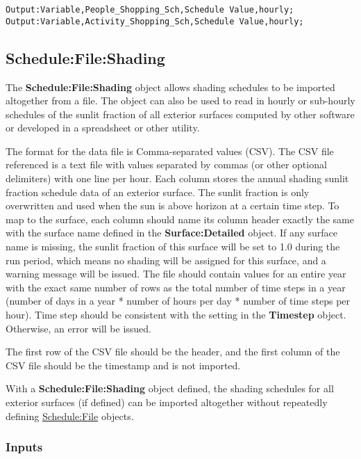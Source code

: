 \begin{lstlisting}
Output:Variable,People_Shopping_Sch,Schedule Value,hourly;
Output:Variable,Activity_Shopping_Sch,Schedule Value,hourly;
\end{lstlisting}

\subsection{Schedule:File:Shading}\label{schedulefileshading}

The \textbf{Schedule:File:Shading} object allows shading schedules to be imported altogether from a file. The object can also be used to read in hourly or sub-hourly schedules of the sunlit fraction of all exterior surfaces computed by other software or developed in a spreadsheet or other utility.

The format for the data file is Comma-separated values (CSV). The CSV file referenced is a text file with values separated by commas (or other optional delimiters) with one line per hour. Each column stores the annual shading sunlit fraction schedule data of an exterior surface. The sunlit fraction is only overwritten and used when the sun is above horizon at a certain time step. To map to the surface, each column should name its column header exactly the same with the surface name defined in the \textbf{Surface:Detailed} object. If any surface name is missing, the sunlit fraction of this surface will be set to 1.0 during the run period, which means no shading will be assigned for this surface, and a warning message will be issued. The file should contain values for an entire year with the exact same number of rows as the total number of time steps in a year (number of days in a year * number of hours per day * number of time steps per hour). Time step should be consistent with the setting in the \textbf{Timestep} object. Otherwise, an error will be issued.

The first row of the CSV file should be the header, and the first column of the CSV file should be the timestamp and is not imported. 

With a \textbf{Schedule:File:Shading} object defined, the shading schedules for all exterior surfaces (if defined) can be imported altogether without repeatedly defining \hyperref[schedulefile]{Schedule:File} objects.

\subsubsection{Inputs}\label{inputs-schedule-file-shading}

